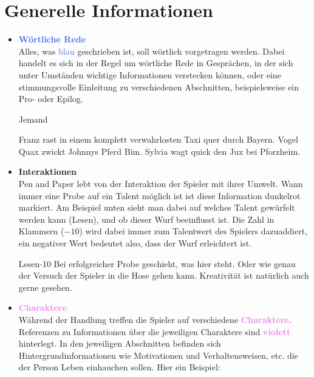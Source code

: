 
\thispagestyle{fancy-info}
\section*{Generelle Informationen}

\begin{itemize}
  \item \textcolor{RoyalBlue}{\textbf{Wörtliche Rede}} \\
  Alles, was \textcolor{RoyalBlue}{blau} geschrieben ist, soll wörtlich vorgetragen werden. Dabei handelt es sich in der Regel
  um wörtliche Rede in Gesprächen, in der sich unter Umständen wichtige Informationen verstecken können, oder eine
  stimmungsvolle Einleitung zu verschiedenen Abschnitten, beispielsweise ein Pro- oder Epilog.

  \begin{say}{Jemand}

  Franz rast in einem komplett verwahrlosten Taxi quer durch Bayern. Vogel Quax zwickt Johnnys Pferd Bim. Sylvia wagt quick den Jux bei Pforzheim.

  \end{say}
  \vspace{-5pt}

  \item \textcolor{RoyalRed}{\textbf{Interaktionen}} \\
  Pen and Paper lebt von der \textcolor{RoyalRed}{Interaktion} der Spieler mit ihrer Umwelt. Wann immer eine Probe auf ein Talent
  möglich ist ist diese Information \textcolor{RoyalRed}{dunkelrot} markiert. Am Beispiel unten sieht man dabei auf welches Talent
  gewürfelt werden kann (Lesen), und ob dieser Wurf beeinflusst ist. Die Zahl in Klammern ($-10$) wird dabei immer zum Talentwert
  des Spielers dazuaddiert, ein negativer Wert bedeutet also, dass der Wurf erleichtert ist.

  \begin{probe}{Lesen}{-10}
  Bei erfolgreicher Probe geschieht, was hier steht. Oder wie genau der Versuch der Spieler in die Hose gehen kann. Kreativität ist natürlich auch gerne gesehen.
  \end{probe}
  \vspace{-5pt}

  \item \textcolor{violet}{\textbf{Charaktere}} \\
  Während der Handlung treffen die Spieler auf verschiedene \textcolor{violet}{\textbf{Charaktere}}. Referenzen zu Informationen über
  die jeweiligen Charaktere sind \textcolor{violet}{\textbf{violett}} hinterlegt. In den jeweiligen Abschnitten befinden sich
  Hintergrundinformationen wie Motivationen und Verhaltensweisen, etc. die der Person Leben einhauchen sollen. Hier ein
  Beispiel:


\end{itemize}
